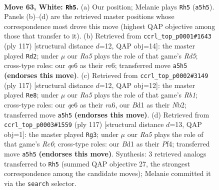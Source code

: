 \documentclass[11pt]{article}
\begin{document}
\clearpage

\begin{figure}[p]\centering
\begin{subfigure}{0.46\textwidth}\centering
\resizebox{\linewidth}{!}{%
\newchessgame
\chessboard[
  setfen={8/8/4q3/R7/1p2k3/b7/6K1/3B4 w - - 16 63},
  showmover=false,
  pgfstyle=straightmove, color=movearrow, markmove={a5-h5}
]}
\caption{}
\end{subfigure}\hfill
\begin{subfigure}{0.46\textwidth}\centering
\resizebox{\linewidth}{!}{%
\newchessgame
\chessboard[
  setfen={8/2k5/4R3/8/1bBr4/1P4K1/8/8 b - - 0 59},
  showmover=false,
  pgfstyle=straightmove, color=movearrow, markmove={d4-d2}
]}
\caption{}
\end{subfigure}
\\[4pt]
\begin{subfigure}{0.46\textwidth}\centering
\resizebox{\linewidth}{!}{%
\newchessgame
\chessboard[
  setfen={1r6/3k4/R7/8/1B6/2P2K2/1n6/8 b - - 2 59},
  showmover=false,
  pgfstyle=straightmove, color=movearrow, markmove={b8-e8}
]}
\caption{}
\end{subfigure}\hfill
\begin{subfigure}{0.46\textwidth}\centering
\resizebox{\linewidth}{!}{%
\newchessgame
\chessboard[
  setfen={8/8/5k2/5B2/4Pp2/2r5/4K3/8 b - - 3 59},
  showmover=false,
  pgfstyle=straightmove, color=movearrow, markmove={c3-g3}
]}
\caption{}
\end{subfigure}
\caption{\textbf{Move 63, White: \texttt{Rh5}.} (a) Our position; Melanie plays \texttt{Rh5} (\texttt{a5h5}). Panels (b)--(d) are the retrieved master positions whose correspondence most drove this move (highest QAP objective among those that transfer to it). (b) Retrieved from \texttt{ccrl\_top\_p0001\#1643} (ply 117) [structural distance $d$=12, QAP obj=14]: the master played \texttt{Rd2}; under $\mu$ our \emph{Ra5} plays the role of that game's \emph{Rd5}; cross-type roles: our \emph{q}e6 as their \emph{r}e6; transferred move \texttt{a5h5} \textbf{(endorses this move)}. (c) Retrieved from \texttt{ccrl\_top\_p0002\#3149} (ply 117) [structural distance $d$=12, QAP obj=12]: the master played \texttt{Re8}; under $\mu$ our \emph{Ra5} plays the role of that game's \emph{Rb1}; cross-type roles: our \emph{q}e6 as their \emph{r}a6, our \emph{B}d1 as their \emph{N}b2; transferred move \texttt{a5h5} \textbf{(endorses this move)}. (d) Retrieved from \texttt{ccrl\_top\_p0003\#1559} (ply 117) [structural distance $d$=13, QAP obj=1]: the master played \texttt{Rg3}; under $\mu$ our \emph{Ra5} plays the role of that game's \emph{Rc6}; cross-type roles: our \emph{B}d1 as their \emph{P}f4; transferred move \texttt{a5h5} \textbf{(endorses this move)}. Synthesis: 3 retrieved analogs transferred to \texttt{Rh5} (summed QAP objective 27, the strongest correspondence among the candidate moves); Melanie committed it via the \texttt{search} selector.}
\label{fig:thought-m124}
\end{figure}
\end{document}
